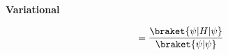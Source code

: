 {\bf Variational}

\begin{equation}
[ E ] = \frac{\braket{\psi|H|\psi}}{\braket{\psi|\psi}}
\end{equation}
